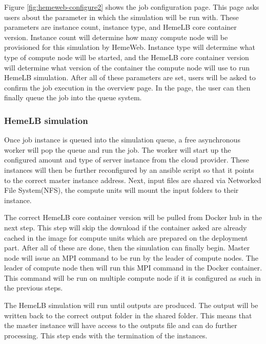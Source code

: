 \vspace{1cm}

Figure \ref{fig:hemeweb-configure2} shows the job configuration page. This page asks users about the parameter in which the simulation will be run with. These parameters are instance count, instance type, and HemeLB core container version. Instance count will determine how many compute node will be provisioned for this simulation by HemeWeb. Instance type will determine what type of compute node will be started, and the HemeLB core container version will determine what version of the container the compute node will use to run HemeLB simulation. After all of these parameters are set, users will be asked to confirm the job execution in the overview page. In the page, the user can then finally queue the job into the queue system.



\subsubsection{HemeLB simulation}

Once job instance is queued into the simulation queue, a free asynchronous worker will pop the queue and run the job. The worker will start up the configured amount and type of server instance from the cloud provider. These instances will then be further reconfigured by an ansible script so that it points to the correct master instance address. Next, input files are shared via Networked File System(NFS), the compute units will mount the input folders to their instance. 

The correct HemeLB core container version will be pulled from Docker hub in the next step. This step will skip the download if the container asked are already cached in the image for compute units which are prepared on the deployment part. After all of these are done, then the simulation can finally begin. Master node will issue an MPI command to be run by the leader of compute nodes. The leader of compute node then will run this MPI command in the Docker container. This command will be run on multiple compute node if it is configured as such in the previous steps. 

The HemeLB simulation will run until outputs are produced. The output will be written back to the correct output folder in the shared folder. This means that the master instance will have access to the outputs file and can do further processing. This step ends with the termination of the instances.

